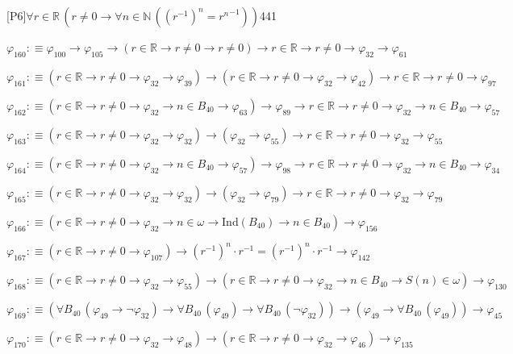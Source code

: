 \begin{fullproof}{[P6]}{$\forall r \in \mathbb{R}\,(r \neq 0 \to \forall n \in \mathbb{N}\,({{(r^{-1})}^{n}} = {{r}^{n}}^{-1}))$}{441}
\begin{abbrevlist}
\item $\varphi_{160} :\equiv \varphi_{100} \to \varphi_{105} \to (r \in \mathbb{R} \to r \neq 0 \to r \neq 0) \to r \in \mathbb{R} \to r \neq 0 \to \varphi_{32} \to \varphi_{61}$
\item $\varphi_{161} :\equiv (r \in \mathbb{R} \to r \neq 0 \to \varphi_{32} \to \varphi_{39}) \to (r \in \mathbb{R} \to r \neq 0 \to \varphi_{32} \to \varphi_{42}) \to r \in \mathbb{R} \to r \neq 0 \to \varphi_{97}$
\item $\varphi_{162} :\equiv (r \in \mathbb{R} \to r \neq 0 \to \varphi_{32} \to n \in B_{40} \to \varphi_{63}) \to \varphi_{89} \to r \in \mathbb{R} \to r \neq 0 \to \varphi_{32} \to n \in B_{40} \to \varphi_{57}$
\item $\varphi_{163} :\equiv (r \in \mathbb{R} \to r \neq 0 \to \varphi_{32} \to \varphi_{32}) \to (\varphi_{32} \to \varphi_{55}) \to r \in \mathbb{R} \to r \neq 0 \to \varphi_{32} \to \varphi_{55}$
\item $\varphi_{164} :\equiv (r \in \mathbb{R} \to r \neq 0 \to \varphi_{32} \to n \in B_{40} \to \varphi_{57}) \to \varphi_{98} \to r \in \mathbb{R} \to r \neq 0 \to \varphi_{32} \to n \in B_{40} \to \varphi_{34}$
\item $\varphi_{165} :\equiv (r \in \mathbb{R} \to r \neq 0 \to \varphi_{32} \to \varphi_{32}) \to (\varphi_{32} \to \varphi_{79}) \to r \in \mathbb{R} \to r \neq 0 \to \varphi_{32} \to \varphi_{79}$
\item $\varphi_{166} :\equiv (r \in \mathbb{R} \to r \neq 0 \to \varphi_{32} \to n \in \omega \to \mathrm{Ind}(B_{40}) \to n \in B_{40}) \to \varphi_{156}$
\item $\varphi_{167} :\equiv (r \in \mathbb{R} \to r \neq 0 \to \varphi_{107}) \to {{(r^{-1})}^{n}} \cdot r^{-1} = {{(r^{-1})}^{n}} \cdot r^{-1} \to \varphi_{142}$
\item $\varphi_{168} :\equiv (r \in \mathbb{R} \to r \neq 0 \to \varphi_{32} \to \varphi_{55}) \to (r \in \mathbb{R} \to r \neq 0 \to \varphi_{32} \to n \in B_{40} \to S(n) \in \omega) \to \varphi_{130}$
\item $\varphi_{169} :\equiv (\forall B_{40}\,(\varphi_{49} \to \neg \varphi_{32}) \to \forall B_{40}\,(\varphi_{49}) \to \forall B_{40}\,(\neg \varphi_{32})) \to (\varphi_{49} \to \forall B_{40}\,(\varphi_{49})) \to \varphi_{45}$
\item $\varphi_{170} :\equiv (r \in \mathbb{R} \to r \neq 0 \to \varphi_{32} \to \varphi_{48}) \to (r \in \mathbb{R} \to r \neq 0 \to \varphi_{32} \to \varphi_{46}) \to \varphi_{135}$

\end{abbrevlist}
\end{fullproof}
